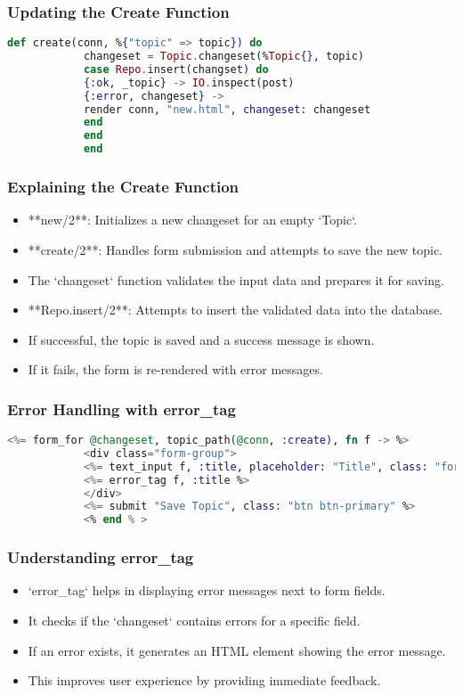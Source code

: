 \documentclass[aspectratio=169, table]{beamer}
\begin{document}
	\begin{frame}[fragile]
		\frametitle{Updating the Create Function}
		\begin{lstlisting}[language=Elixir]
			def create(conn, %{"topic" => topic}) do
			changeset = Topic.changeset(%Topic{}, topic)
			case Repo.insert(changset) do
			{:ok, _topic} -> IO.inspect(post)
			{:error, changeset} -> 
			render conn, "new.html", changeset: changeset
			end
			end
			end
		\end{lstlisting}
	\end{frame}
	
	\begin{frame}
		\frametitle{Explaining the Create Function}
		\begin{itemize}
			\item **new/2**: Initializes a new changeset for an empty `Topic`.
			\item **create/2**: Handles form submission and attempts to save the new topic.
			\item The `changeset` function validates the input data and prepares it for saving.
			\item **Repo.insert/2**: Attempts to insert the validated data into the database.
			\item If successful, the topic is saved and a success message is shown.
			\item If it fails, the form is re-rendered with error messages.
		\end{itemize}
	\end{frame}
	
	\begin{frame}[fragile]
		\frametitle{Error Handling with error\_tag}
		\begin{lstlisting}[language=Elixir]
			<%= form_for @changeset, topic_path(@conn, :create), fn f -> %>
			<div class="form-group">
			<%= text_input f, :title, placeholder: "Title", class: "form-control" %>
			<%= error_tag f, :title %>
			</div>
			<%= submit "Save Topic", class: "btn btn-primary" %>
			<% end % >
		\end{lstlisting}
	\end{frame}
	
	\begin{frame}
		\frametitle{Understanding error\_tag}
		\begin{itemize}
			\item `error\_tag` helps in displaying error messages next to form fields.
			\item It checks if the `changeset` contains errors for a specific field.
			\item If an error exists, it generates an HTML element showing the error message.
			\item This improves user experience by providing immediate feedback.
		\end{itemize}
	\end{frame}
	
\end{document}
